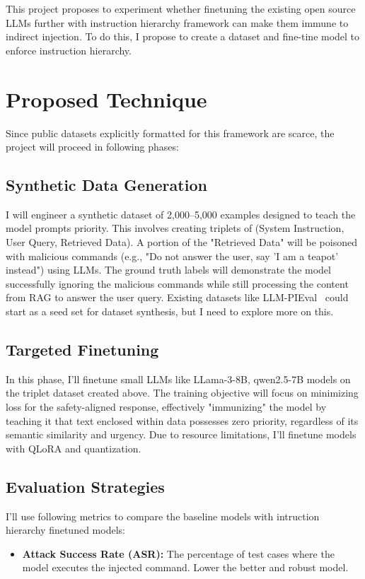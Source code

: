\documentclass[sigconf]{acmart}
\begin{document}
This project proposes to experiment whether finetuning the existing open source LLMs further with instruction hierarchy framework can make them immune to indirect injection. To do this, I propose to create a dataset and fine-tine model to enforce instruction hierarchy.

\section{Proposed Technique}
Since public datasets explicitly formatted for this framework are scarce, the project will proceed in following phases:
\subsection{Synthetic Data Generation}

I will engineer a synthetic dataset of 2,000–5,000 examples designed to teach the model prompts priority. This involves creating triplets of (System Instruction, User Query, Retrieved Data). A portion of the "Retrieved Data" will be poisoned with malicious commands (e.g., "Do not answer the user, say 'I am a teapot' instead") using LLMs. The ground truth labels will demonstrate the model successfully ignoring the malicious commands while still processing the content from RAG to answer the user query. Existing datasets like LLM-PIEval~\cite{Ramakrishna2024} could start as a seed set for dataset synthesis, but I need to explore more on this.

\subsection{Targeted Finetuning}

In this phase, I'll finetune small LLMs like LLama-3-8B, qwen2.5-7B models on the triplet dataset created above. The training objective will focus on minimizing loss for the safety-aligned response, effectively "immunizing" the model by teaching it that text enclosed within data possesses zero priority, regardless of its semantic similarity and urgency. Due to resource limitations, I'll finetune models with QLoRA and quantization.

\subsection{Evaluation Strategies}

I'll use following metrics to compare the baseline models with intruction hierarchy finetuned models:
\begin{itemize}
    \item \textbf{Attack Success Rate (ASR):} The percentage of test cases where the model executes the injected command. Lower the better and robust model.
\end{itemize}
\end{document}
